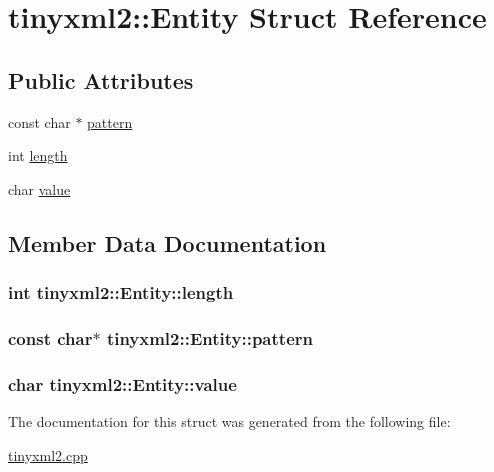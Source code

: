 \hypertarget{structtinyxml2_1_1_entity}{}\section{tinyxml2\+:\+:Entity Struct Reference}
\label{structtinyxml2_1_1_entity}
\subsection*{Public Attributes}
\begin{DoxyCompactItemize}
\item 
const char $\ast$ \hyperlink{structtinyxml2_1_1_entity_ab330f5d665d29bfc811ecfa76315894b}{pattern}
\item 
int \hyperlink{structtinyxml2_1_1_entity_a25e2b57cb59cb4fa68f283d7cb570f21}{length}
\item 
char \hyperlink{structtinyxml2_1_1_entity_a7334e81e33b4615655a403711b24f3ed}{value}
\end{DoxyCompactItemize}


\subsection{Member Data Documentation}
\hypertarget{structtinyxml2_1_1_entity_a25e2b57cb59cb4fa68f283d7cb570f21}{}
\subsubsection[{length}]{\setlength{\rightskip}{0pt plus 5cm}int tinyxml2\+::\+Entity\+::length}\label{structtinyxml2_1_1_entity_a25e2b57cb59cb4fa68f283d7cb570f21}
\hypertarget{structtinyxml2_1_1_entity_ab330f5d665d29bfc811ecfa76315894b}{}
\subsubsection[{pattern}]{\setlength{\rightskip}{0pt plus 5cm}const char$\ast$ tinyxml2\+::\+Entity\+::pattern}\label{structtinyxml2_1_1_entity_ab330f5d665d29bfc811ecfa76315894b}
\hypertarget{structtinyxml2_1_1_entity_a7334e81e33b4615655a403711b24f3ed}{}
\subsubsection[{value}]{\setlength{\rightskip}{0pt plus 5cm}char tinyxml2\+::\+Entity\+::value}\label{structtinyxml2_1_1_entity_a7334e81e33b4615655a403711b24f3ed}


The documentation for this struct was generated from the following file\+:\begin{DoxyCompactItemize}
\item 
\hyperlink{tinyxml2_8cpp}{tinyxml2.\+cpp}\end{DoxyCompactItemize}
